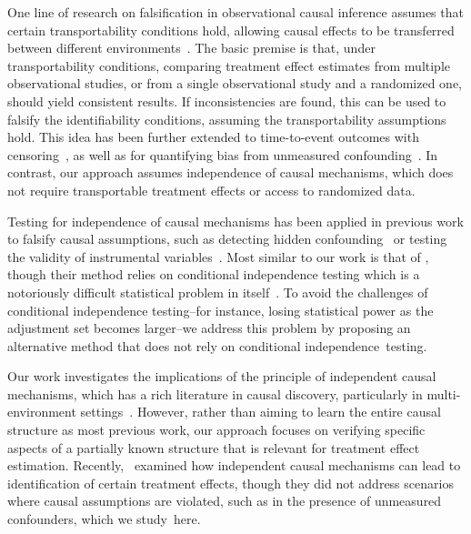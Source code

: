 \documentclass{article}
\begin{document}
One line of research on falsification in observational causal inference assumes that certain transportability conditions hold, allowing causal effects to be transferred between different environments~\citep{dahabreh2020benchmarking,hussain2022falsification,hussain2023falsification}. The basic premise is that, under transportability conditions, comparing treatment effect estimates from multiple observational studies, or from a single observational study and a randomized one, should yield consistent results. If inconsistencies are found, this can be used to falsify the identifiability conditions, assuming the transportability assumptions hold. This idea has been further extended to time-to-event outcomes with censoring~\citep{demirel2024benchmarking}, as well as for quantifying bias from unmeasured confounding~\citep{de2024detecting, de2024hidden}. In contrast, our approach assumes independence of causal mechanisms, which does not require transportable treatment effects or access to randomized data. 

Testing for independence of causal mechanisms has been applied in previous work to falsify causal assumptions, such as detecting hidden confounding~\citep{karlsson2023detecting} or testing the validity of instrumental variables~\citep{burauel2023evaluating}. Most similar to our work is that of \citet{karlsson2023detecting}, though their method relies on conditional independence testing which is a notoriously difficult statistical problem in itself~\citep{shah2020hardness}. To avoid the challenges of conditional independence testing--for instance, losing statistical power as the adjustment set becomes larger--we address this problem by proposing an alternative method that does not rely on conditional independence~testing.


Our work investigates the implications of the principle of independent causal mechanisms, which has a rich literature in causal discovery, particularly in multi-environment settings~\citep{ huang2020causal, perry2022causal,guo2024causal,mameche2024learning}. However, rather than aiming to learn the entire causal structure as most previous work, our approach focuses on verifying specific aspects of a partially known structure that is relevant for treatment effect estimation. Recently,~\citet{guo2024finetti} examined how independent causal mechanisms can lead to identification of certain treatment effects, though they did not address scenarios where causal assumptions are violated, such as in the presence of unmeasured confounders, which we study~here.
\end{document}
